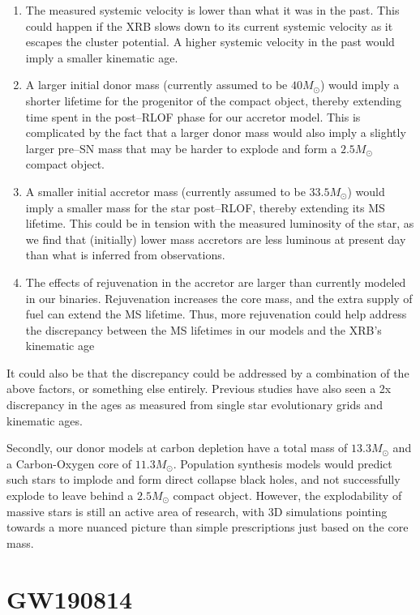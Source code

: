 \documentclass[linenumbers,trackchanges,twocolumn]{aastex701}
\begin{document}
\begin{enumerate}
    \item The measured systemic velocity is lower than what it was in the past. This could happen if the XRB slows down to its current systemic velocity as it escapes the cluster potential. A higher systemic velocity in the past would imply a smaller kinematic age.
    \item A larger initial donor mass (currently assumed to be $40M_{\odot}$) would imply a shorter lifetime for the progenitor of the compact object, thereby extending time spent in the post--RLOF phase for our accretor model. This is complicated by the fact that a larger donor mass would also imply a slightly larger pre--SN mass that may be harder to explode and form a $2.5M_{\odot}$ compact object.
    \item A smaller initial accretor mass (currently assumed to be $33.5M_{\odot}$) would imply a smaller mass for the star post--RLOF, thereby extending its MS lifetime. This could be in tension with the measured luminosity of the star, as we find that (initially) lower mass accretors are less luminous at present day than what is inferred from observations.
    \item The effects of rejuvenation in the accretor are larger than currently modeled in our binaries. Rejuvenation increases the core mass, and the extra supply of fuel can extend the MS lifetime. Thus, more rejuvenation could help address the discrepancy between the MS lifetimes in our models and the XRB's kinematic age
\end{enumerate}

It could also be that the discrepancy could be addressed by a combination of the above factors, or something else entirely. Previous studies have also seen a 2x discrepancy in the ages as measured from single star evolutionary grids and kinematic ages.


Secondly, our donor models at carbon depletion have a total mass of $13.3M_{\odot}$ and a Carbon-Oxygen core of $11.3M_{\odot}$. Population synthesis models would predict such stars to implode and form direct collapse black holes, and not successfully explode to leave behind a $2.5M_{\odot}$ compact object. However, the explodability of massive stars is still an active area of research, with 3D simulations pointing towards a more nuanced picture than simple prescriptions just based on the core mass. 

\section{GW190814}
\end{document}
